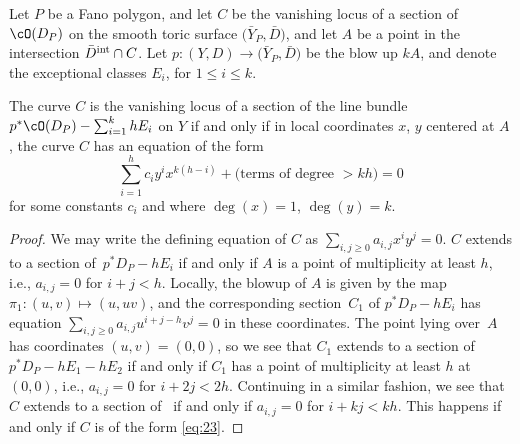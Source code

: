  Let $P$ be a Fano polygon, and let $C$ be the vanishing locus of a section of $\cO(D_P)$ on the smooth toric surface $\bigl(\bar{Y}_P, \bar{D}\bigr)$, and let $A$ be a point in the intersection $\bar{D}^{\rm int} \cap C$. Let $p \colon (Y, D) \rightarrow \bigl(\bar{Y}_P, \bar{D}\bigr)$ be the blow up $kA$, and denote the exceptional classes $E_i$, for $1 \leq i \leq k$.
\begin{Lemma}\label{lem:mutabilitygeometric}
	The curve $C$ is the vanishing locus of a section of the line bundle
$
	p^*\cO(D_P)-\sum_{i=1}^k h E_i
$
	 on $Y$ if and only if in local coordinates $x$, $y$ centered at $A$, the curve $C$ has an equation of the form
	\begin{equation}\label{eq:23}
		\sum_{i=1}^hc_i y^ix^{k(h-i)}+\text{$($terms of degree $>kh)$}=0
	\end{equation}
for some constants $c_i$ and where $\deg(x)=1$, $\deg(y)=k$.
\end{Lemma}
\begin{proof}
	We may write the defining equation of $C$ as $\sum_{i,j \geq 0} a_{i,j} x^i y^j=0$. $C$ extends to a section of~${p^*D_P-hE_i}$ if and only if $A$ is a point of multiplicity at least $h$, i.e., $a_{i,j}=0$ for $i+j<h$.
	Locally, the blowup of $A$ is given by the map $\pi_1 \colon (u,v) \mapsto (u, uv)$, and the corresponding section~$C_1$ of $p^*D_P-hE_i$ has equation
$\sum_{i,j \geq 0} a_{i,j} u^{i+j-h}v^j=0$
	 in these coordinates. The point lying over~$A$ has coordinates $(u,v)=(0,0)$, so we see that $C_1$ extends to a section of $p^*D_P-hE_1-hE_2$ if and only if $C_1$ has a point of multiplicity at least $h$ at $(0,0)$, i.e., $a_{i, j}=0$ for $i+2j<2h$.
	Continuing in a similar fashion, we see that $C$ extends to a section of~ if and only if $a_{i,j}=0$ for $i+kj<kh$.
	This happens if and only if $C$ is of the form \eqref{eq:23}.
\end{proof}

